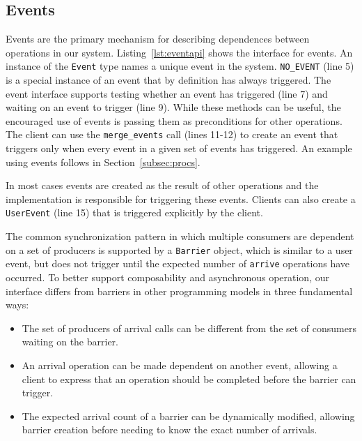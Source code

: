 \subsection{Events}
\label{subsec:events}
Events are the primary mechanism for describing dependences between operations in our system.
Listing~\ref{lst:eventapi} shows the interface for events.  An instance of the {\tt Event} type 
names a unique event in the system.  {\tt NO\_EVENT} (line 5) is a special instance
of an event that by definition has always triggered.  The event interface
supports testing whether an event has triggered (line 7) and waiting on
an event to trigger (line 9).  While these methods can be useful, the encouraged
use of events is passing them as preconditions for other operations.  The client can use the
{\tt merge\_events} call (lines 11-12) to create an event that triggers only when every
event in a given set of events has triggered.  An example using events follows in
Section~\ref{subsec:procs}.

In most cases events are created as the result of other
operations and the implementation is responsible for triggering these events.  Clients
can also create a {\tt UserEvent} (line 15) that is triggered explicitly by the client.

The common synchronization pattern in which multiple consumers are dependent on
a set of producers is supported by a {\tt Barrier} object, which is similar
to a user event, but does not trigger until the expected number of {\tt arrive}
operations have occurred.  To better support
composability and asynchronous operation, our interface differs from barriers in other programming
models\cite{MPI} in three fundamental ways:
\begin{itemize} \itemsep1pt \parskip0pt 
\item The set of producers of arrival calls can be different from the set of consumers waiting on the barrier.
\item An arrival operation can be made dependent on another event, allowing a client to
express that an operation should be completed before the barrier can trigger.
\item The expected arrival count of a barrier can be dynamically modified, allowing
barrier creation before needing to know the exact number of arrivals.
\end{itemize}

